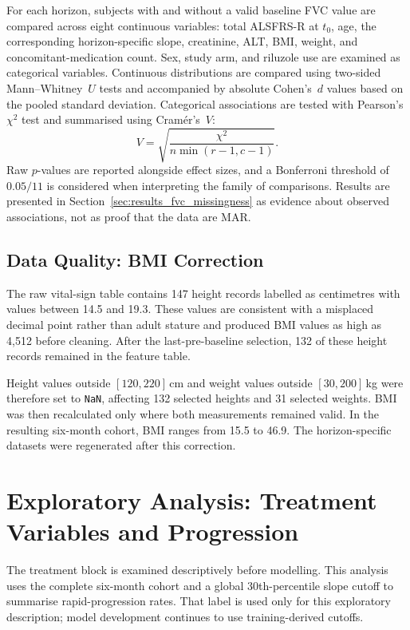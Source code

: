 For each horizon, subjects with and without a valid baseline FVC value are compared across eight continuous variables: total \gls{ALSFRS-R} at $t_0$, age, the corresponding horizon-specific slope, creatinine, \gls{ALT}, \gls{BMI}, weight, and concomitant-medication count. Sex, study arm, and riluzole use are examined as categorical variables. Continuous distributions are compared using two-sided Mann--Whitney~$U$ tests and accompanied by absolute Cohen's~$d$ values based on the pooled standard deviation. Categorical associations are tested with Pearson's $\chi^2$ test and summarised using Cram\'er's~$V$:
\[
  V=\sqrt{\frac{\chi^2}{n\min(r-1,c-1)}}.
\]
Raw $p$-values are reported alongside effect sizes, and a Bonferroni threshold of $0.05/11$ is considered when interpreting the family of comparisons. Results are presented in Section~\ref{sec:results_fvc_missingness} as evidence about observed associations, not as proof that the data are \gls{MAR}.

\subsection{Data Quality: BMI Correction}
\label{sec:methods_bmi_correction}
The raw vital-sign table contains 147 height records labelled as centimetres with values between 14.5 and 19.3. These values are consistent with a misplaced decimal point rather than adult stature and produced \gls{BMI} values as high as 4,512 before cleaning. After the last-pre-baseline selection, 132 of these height records remained in the feature table.

Height values outside $[120,220]$\,cm and weight values outside $[30,200]$\,kg were therefore set to \texttt{NaN}, affecting 132 selected heights and 31 selected weights. \gls{BMI} was then recalculated only where both measurements remained valid. In the resulting six-month cohort, BMI ranges from 15.5 to 46.9. The horizon-specific datasets were regenerated after this correction.

\section{Exploratory Analysis: Treatment Variables and Progression}
\label{sec:methods_eda_treatment}
The treatment block is examined descriptively before modelling. This analysis uses the complete six-month cohort and a global 30th-percentile slope cutoff to summarise rapid-progression rates. That label is used only for this exploratory description; model development continues to use training-derived cutoffs.

